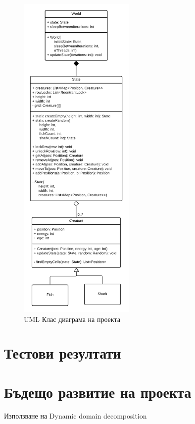 \documentclass{article}
\begin{document}
\begin{figure}[H]
	\centering
	\includegraphics[width=0.5\textwidth]{classes-uml.png}
	\caption{UML Клас диаграма на проекта}
	\label{fig:figure1}
\end{figure}


\section{Тестови резултати}


\section{Бъдещо развитие на проекта}
Използване на Dynamic domain decomposition

{}

\end{document}
